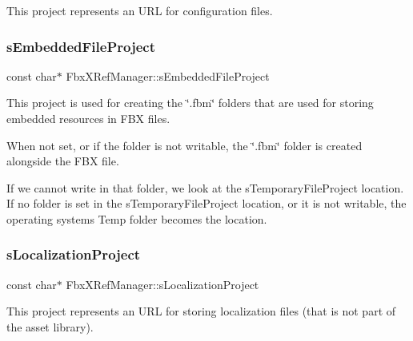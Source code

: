 This project represents an U\+RL for configuration files. 

\mbox{\label{class_fbx_x_ref_manager_a9d815646f6d592942ce288a4de5eb39d}} 
\subsubsection{\texorpdfstring{s\+Embedded\+File\+Project}{sEmbeddedFileProject}}
{\footnotesize\ttfamily const char$\ast$ Fbx\+X\+Ref\+Manager\+::s\+Embedded\+File\+Project\hspace{0.3cm}{\ttfamily [static]}}

This project is used for creating the \char`\"{}.\+fbm\char`\"{} folders that are used for storing embedded resources in F\+BX files.

When not set, or if the folder is not writable, the \char`\"{}.\+fbm\char`\"{} folder is created alongside the F\+BX file.

If we cannot write in that folder, we look at the s\+Temporary\+File\+Project location. If no folder is set in the s\+Temporary\+File\+Project location, or it is not writable, the operating system\textquotesingle{}s Temp folder becomes the location. \mbox{\label{class_fbx_x_ref_manager_ac37aa54c7d0914ed376e7f4dd6f51229}} 
\subsubsection{\texorpdfstring{s\+Localization\+Project}{sLocalizationProject}}
{\footnotesize\ttfamily const char$\ast$ Fbx\+X\+Ref\+Manager\+::s\+Localization\+Project\hspace{0.3cm}{\ttfamily [static]}}



This project represents an U\+RL for storing localization files (that is not part of the asset library). 

\mbox{\label{class_fbx_x_ref_manager_ac1e95d1bc9cb30f5e9c75f08791e286f}} 
